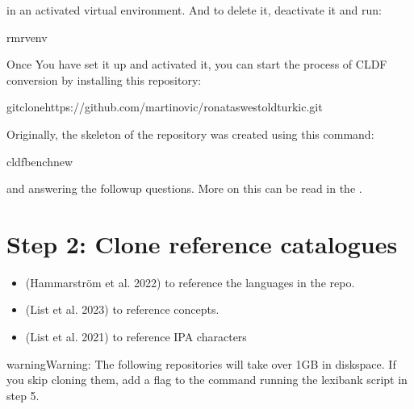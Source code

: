 \documentclass[letterpaper,10pt,english]{sphinxmanual}
\begin{document}
{{{{\sphinxAtStartPar
in an activated virtual environment. And to delete it, deactivate it and run:

\begin{sphinxVerbatim}[commandchars=\\\{\}]
rm\PYGZhy{}rvenv
\end{sphinxVerbatim}

\sphinxAtStartPar
Once You have set it up and activated it, you can start the process
of CLDF conversion by installing this repository:

\begin{sphinxVerbatim}[commandchars=\\\{\}]
gitclonehttps://github.com/martino\PYGZhy{}vic/ronataswestoldturkic.git
\end{sphinxVerbatim}

\sphinxAtStartPar
Originally, the skeleton of the repository was created using this command:

\begin{sphinxVerbatim}[commandchars=\\\{\}]
cldfbenchnew
\end{sphinxVerbatim}

\sphinxAtStartPar
and answering the follow\sphinxhyphen{}up questions. More on this can be read in the
.


\section{Step 2: Clone reference catalogues}
\label{\detokenize{mkcldf:step-2-clone-reference-catalogues}}\begin{itemize}
\item {} 
\sphinxAtStartPar
{} (Hammarström et al. 2022)
to reference the languages in the repo.

\item {} 
\sphinxAtStartPar
{} (List et al. 2023) to
reference concepts.

\item {} 
\sphinxAtStartPar
{} (List et al. 2021) to reference IPA
characters

\end{itemize}

\begin{sphinxadmonition}{warning}{Warning:}
\sphinxAtStartPar
The following repositories will take over 1GB in disk\sphinxhyphen{}space. If you skip
cloning them,
add a  flag to the command running the lexibank script in step 5.
\end{sphinxadmonition}

}}}}
\end{document}
